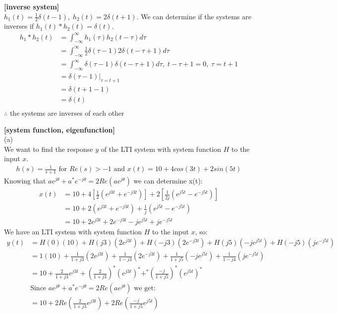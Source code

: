 \documentclass{article}
\begin{document}
 {\bf [inverse system]}\\
$h_1(t) = \frac{1}{2}\delta(t - 1), \; h_2(t) = 2\delta(t + 1)$. We can determine if the systems are inverses if $h_1(t) * h_2(t) = \delta(t)$.
\begin{equation*}
\begin{split}
    h_1 * h_2(t) &=  \int_{-\infty}^{\infty} h_1(\tau) h_2(t - \tau)d\tau\\
    &= \int_{-\infty}^{\infty} \frac{1}{2} \delta(\tau - 1) 2\delta(t - \tau + 1)d\tau\\
    &= \int_{-\infty}^{\infty} \delta(\tau - 1) \delta(t - \tau + 1) d\tau, \; t - \tau + 1 = 0, \; \tau = t + 1\\
    &= \delta(\tau - 1)\big|_{\tau = t + 1}\\
    &= \delta(t + 1 - 1)\\
    &= \delta(t)\\
\end{split}
\end{equation*}
$\therefore$ the systems are inverses of each other

 {\bf [system function, eigenfunction]}\\
(a)\\
We want to find the response $y$ of the LTI system with system function $H$ to the input $x$.
\begin{equation*}
\begin{split}
    h(s) = \frac{1}{s + 1} \text{ for } Re(s) > -1 \text{ and } x(t) = 10 + 4cos(3t) + 2sin(5t)
\end{split}
\end{equation*}
Knowing that $ae^{j\theta} + a^*e^{-j\theta} = 2Re(ae^{j\theta})$ we can determine x(t):
\begin{equation*}
\begin{split}
    x(t) &= 10 + 4[\frac{1}{2}(e^{j3t} + e^{-j3t})] + 2[\frac{1}{2j}(e^{j5t} - e^{-j5t})]\\
    &= 10 + 2(e^{j3t} + e^{-j3t}) + \frac{1}{j}(e^{j5t} - e^{-j5t})\\
    &= 10 + 2e^{j3t} + 2e^{-j3t} - je^{j5t} + je^{-j5t}
\end{split}
\end{equation*}
We have an LTI system with system function $H$ to the input $x$, so:
\begin{equation*}
\begin{split}
    y(t) &= H(0)(10) + H(j3)(2e^{j3t}) + H(-j3)(2e^{-j3t}) + H(j5)(-je^{j5t}) + H(-j5)(je^{-j5t})\\
    &= 1(10) + \frac{1}{1 + j3}(2e^{j3t}) + \frac{1}{1 - j3}(2e^{-j3t}) + \frac{1}{1 + j5}(-je^{j5t}) + \frac{1}{1 - j4}(je^{-j5t})\\
    &= 10 + \frac{2}{1 + j3}e^{j3t} + (\frac{2}{1 + j3})^*(e^{j3t})^* + ^*(\frac{-j}{1 + j5})^*(e^{j5t})^*\\
    & \text{Since } ae^{j\theta} + a^*e^{-j\theta} = 2Re(ae^{j\theta}) \text{ we get:}\\
    &= 10 + 2Re(\frac{2}{1 + j3}e^{j3t}) + 2 Re(\frac{-j}{1 + j5}e^{j5t})\\
\end{split}
\end{equation*}
\end{document}
